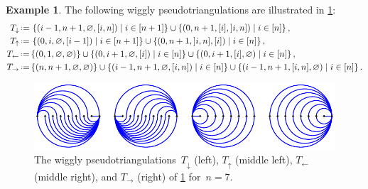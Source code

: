 \documentclass{amsart}
\theoremstyle{definition}
\newtheorem{example}[theorem]{Example}
\newcommand{\set}[2]{\left\{ #1 \;\middle|\; #2 \right\}} %
\newcommand{\eqdef}{\mbox{\,\raisebox{0.2ex}{\scriptsize\ensuremath{\mathrm:}}\ensuremath{=}\,}} %
\begin{document}
\begin{example}
\label{exm:specialWigglyPseudotriangulations}
The following wiggly pseudotriangulations are illustrated in \cref{fig:specialWigglyPseudotriangulations}:
\begin{align*}
T_\downarrow & \eqdef \set{(i-1, n+1, \varnothing, {[i,n]})}{i \in [n+1]} \cup \set{(0, n+1, [i], {]i,n]})}{i \in [n]}, \\
T_\uparrow & \eqdef \set{(0, i, \varnothing, {[i-1]})}{i \in [n+1]} \cup \set{(0, n+1, {]i,n]}, [i])}{i \in [n]}, \\
T_\leftarrow & \eqdef \{(0, 1, \varnothing, \varnothing)\} \cup \set{(0, i+1, \varnothing, [i])}{i \in [n]} \cup \set{(0, i+1, [i], \varnothing)}{i \in [n]}, \\
T_\rightarrow & \eqdef \{(n, n+1, \varnothing, \varnothing)\} \cup \set{(i-1, n+1, \varnothing, [i,n])}{i \in [n]} \cup \set{(i-1, n+1, [i,n], \varnothing)}{i \in [n]}.
\end{align*}
%
\begin{figure}[h]
\centerline{\includegraphics[scale=1.3]{specialWigglyPseudotriangulations}}
\caption{The wiggly pseudotriangulations~$T_\downarrow$ (left), $T_\uparrow$ (middle left), $T_\leftarrow$ (middle right), and $T_\rightarrow$ (right) of \cref{exm:specialWigglyPseudotriangulations} for~$n = 7$.}
\label{fig:specialWigglyPseudotriangulations}
\end{figure}
\end{example}
\end{document}
